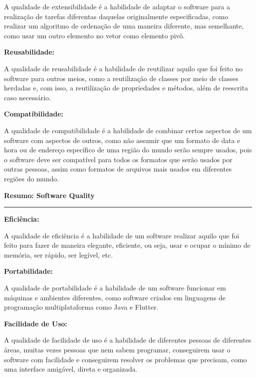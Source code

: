 \documentclass{article}
\begin{document}
\medskip

A qualidade de extensibilidade é a habilidade de adaptar o software para a realização de tarefas diferentas daquelas originalmente especificadas, como realizar um algoritmo de ordenação de uma maneira diferente, mas semelhante, como usar um outro elemento no vetor como elemento pivô.

\medskip

\textbf{Reusabilidade:}

\medskip

A qualidade de reusabilidade é a habilidade de reutilizar aquilo que foi feito no software para outros meios, como a reutilização de classes por meio de classes herdadas e, com isso, a reutilização de propriedades e métodos, além de reescrita caso necessário.

\medskip

\textbf{Compatibilidade:}

\medskip

A qualidade de compatibilidade é a habilidade de combinar certos aspectos de um software com aspectos de outros, como não assumir que um formato de data e hora ou de endereço específico de uma região do mundo serão sempre usados, pois o software deve ser compatível para todos os formatos que serão usados por outras pessoas, assim como formatos de arquivos mais usados em diferentes regiões do mundo.

\pagebreak

\begin{center}

    \vspace*{-7mm}
    \textbf{\large{Resumo: Software Quality}}
    \vspace*{-5mm}

\end{center}

\noindent\rule{\textwidth}{0.5pt}

\bigskip

\textbf{Eficiência:}

\medskip

A qualidade de eficiência é a habilidade de um software realizar aquilo que foi feito para fazer de maneira elegante, eficiente, ou seja, usar e ocupar o mínimo de memória, ser rápido, ser legível, etc.

\medskip

\textbf{Portabilidade:}

\medskip

A qualidade de portabilidade é a habilidade de um software funcionar em máquinas e ambientes diferentes, como software criados em linguagens de programação multiplataforma como Java e Flutter.

\medskip

\textbf{Facilidade de Uso:}

\medskip

A qualidade de facilidade de uso é a habilidade de diferentes pessoas de diferentes áreas, muitas vezes pessoas que nem sabem programar, conseguirem usar o software com facilidade e conseguirem resolver os problemas que precisam, como uma interface amigável, direta e organizada.
\end{document}
